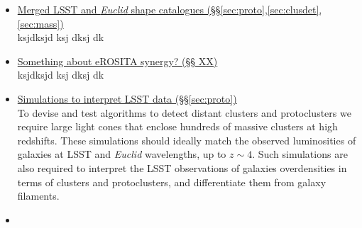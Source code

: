 \documentclass[a4paper,11pt]{article}
\begin{document}
\begin{itemize}
\item\underline{Merged LSST and \emph{Euclid} shape
  catalogues
  (\S\S\ref{sec:proto},\ref{sec:clusdet},\ref{sec:mass})}\smallskip\\ksjdksjd ksj dksj dk

\item\underline{Something about eROSITA synergy? (\S\S
  XX)}\smallskip\\ksjdksjd ksj dksj dk
\item\underline{Simulations to interpret LSST data 
  (\S\S\ref{sec:proto})}\smallskip\\ 
  To devise and test algorithms to detect distant clusters and protoclusters we require large light cones that enclose hundreds of massive clusters at high redshifts. These simulations should ideally match the observed luminosities of galaxies at LSST and \emph{Euclid} wavelengths, up to $z\sim4$.
 Such simulations are also required to interpret the LSST observations of galaxies overdensities in terms of clusters and protoclusters, and differentiate them from galaxy filaments. 
\item
\end{itemize}






\end{document}
